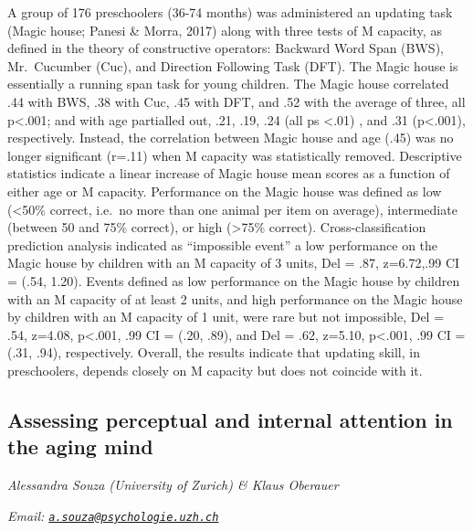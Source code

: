 \documentclass[
  12pt,
]{book}
\begin{document}
A group of 176 preschoolers (36-74 months) was administered an updating task (Magic house; Panesi \& Morra, 2017) along with three tests of M capacity, as defined in the theory of constructive operators: Backward Word Span (BWS), Mr.~Cucumber (Cuc), and Direction Following Task (DFT). The Magic house is essentially a running span task for young children. The Magic house correlated .44 with BWS, .38 with Cuc, .45 with DFT, and .52 with the average of three, all p\textless.001; and with age partialled out, .21, .19, .24 (all ps \textless.01) , and .31 (p\textless.001), respectively. Instead, the correlation between Magic house and age (.45) was no longer significant (r=.11) when M capacity was statistically removed. Descriptive statistics indicate a linear increase of Magic house mean scores as a function of either age or M capacity. Performance on the Magic house was defined as low (\textless50\% correct, i.e.~no more than one animal per item on average), intermediate (between 50 and 75\% correct), or high (\textgreater75\% correct). Cross-classification prediction analysis indicated as ``impossible event'' a low performance on the Magic house by children with an M capacity of 3 units, Del = .87, z=6.72,.99 CI = (.54, 1.20). Events defined as low performance on the Magic house by children with an M capacity of at least 2 units, and high performance on the Magic house by children with an M capacity of 1 unit, were rare but not impossible, Del = .54, z=4.08, p\textless.001, .99 CI = (.20, .89), and Del = .62, z=5.10, p\textless.001, .99 CI = (.31, .94), respectively. Overall, the results indicate that updating skill, in preschoolers, depends closely on M capacity but does not coincide with it.

\hypertarget{assessing-perceptual-and-internal-attention-in-the-aging-mind}{%
\subsection{Assessing perceptual and internal attention in the aging mind}\label{assessing-perceptual-and-internal-attention-in-the-aging-mind}}

\emph{Alessandra Souza (University of Zurich) \& Klaus Oberauer}

\emph{Email: \href{mailto:a.souza@psychologie.uzh.ch}{\nolinkurl{a.souza@psychologie.uzh.ch}}}
\end{document}
